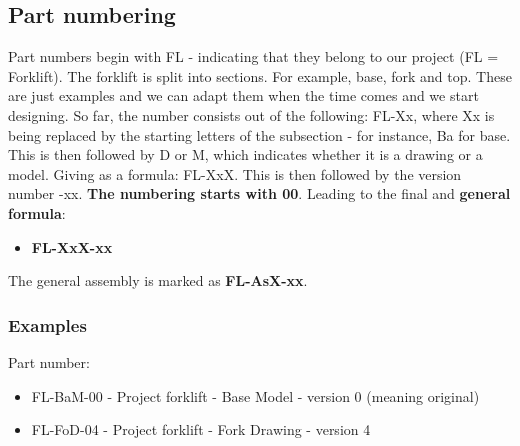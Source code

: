 \documentclass[../report.tex]{subfiles}
\begin{document}
    
    \subsection{Part numbering}
    Part numbers begin with FL - indicating that they belong to our project (FL = Forklift). 
    The forklift is split into sections. For example, base, fork and top. These are just
    examples and we can adapt them when the time comes and we start designing.
    So far, the number consists out of the following: FL-Xx, where Xx is being replaced by the starting
    letters of the subsection - for instance, Ba for base. This is then followed by D or M, which indicates
    whether it is a drawing or a model. Giving as a formula:
    FL-XxX. This is then followed by the version number -xx. \textbf{The numbering starts with 00}. Leading to the final 
    and \textbf{general formula}:

    \begin{itemize}
        \item \textbf{FL-XxX-xx}
    \end{itemize}

    The general assembly is marked as \textbf{FL-AsX-xx}.

    \subsubsection{Examples}
    Part number: 
    \begin{itemize}
        \item FL-BaM-00 - Project forklift - Base Model - version 0 (meaning original)
        \item FL-FoD-04 - Project forklift - Fork Drawing - version 4
    \end{itemize}
\end{document}
